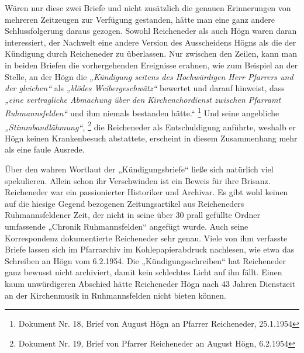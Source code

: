 \documentclass[a4paper]{article}
\newcommand\textstyleZitate[1]{\textit{#1}}
\begin{document}
Wären nur diese zwei Briefe und nicht zusätzlich die genauen
Erinnerungen von mehreren Zeitzeugen zur Verfügung gestanden, hätte man
eine ganz andere Schlussfolgerung daraus gezogen. Sowohl Reicheneder
als auch Högn waren daran interessiert, der Nachwelt eine andere
Version des Ausscheidens Högns als die der Kündigung durch Reicheneder
zu überlassen. Nur zwischen den Zeilen, kann man in beiden Briefen die
vorhergehenden Ereignisse erahnen, wie zum Beispiel an der Stelle, an
der Högn die \textstyleZitate{„Kündigung seitens des Hochwürdigen Herr
Pfarrers und der gleichen“} als \textstyleZitate{„blödes
Weibergeschwätz“} bewertet und darauf hinweist, dass
\textstyleZitate{„eine vertragliche Abmachung über den
Kirchenchordienst zwischen Pfarramt Ruhmannsfelden“ }und ihm niemals
bestanden hätte.“  \footnote{Dokument Nr. 18, Brief von August Högn an
Pfarrer Reicheneder, 25.1.1954}\textstyleZitate{ }Und seine angebliche
\textstyleZitate{„Stimmbandlähmung“,} \footnote{Dokument Nr. 19, Brief
von Pfarrer Reicheneder an August Högn, 6.2.1954}\textstyleZitate{ }die
Reicheneder als Entschuldigung anführte, weshalb er Högn keinen
Krankenbesuch abstattete, erscheint in diesem Zusammenhang mehr als
eine faule Ausrede.

Über den wahren Wortlaut der „Kündigungsbriefe“ ließe sich natürlich
viel spekulieren. Allein schon ihr Verschwinden ist ein Beweis für ihre
Brisanz. Reicheneder war ein passionierter Historiker und Archivar. Es
gibt wohl keinen auf die hiesige Gegend bezogenen Zeitungsartikel aus
Reicheneders Ruhmannsfeldener Zeit, der nicht in seine über 30 prall
gefüllte Ordner umfassende „Chronik Ruhmannsfelden“ angefügt wurde.
Auch seine Korrespondenz dokumentierte Reicheneder sehr genau. Viele
von ihm verfasste Briefe lassen sich im Pfarrarchiv im
Kohlepapierabdruck nachlesen, wie etwa das Schreiben an Högn vom
6.2.1954. Die „Kündigungsschreiben“ hat Reicheneder ganz bewusst nicht
archiviert, damit kein schlechtes Licht auf ihn fällt. Einen kaum
unwürdigeren Abschied hätte Reicheneder Högn nach 43 Jahren Dienstzeit
an der Kirchenmusik in Ruhmannsfelden nicht bieten können.
\end{document}
